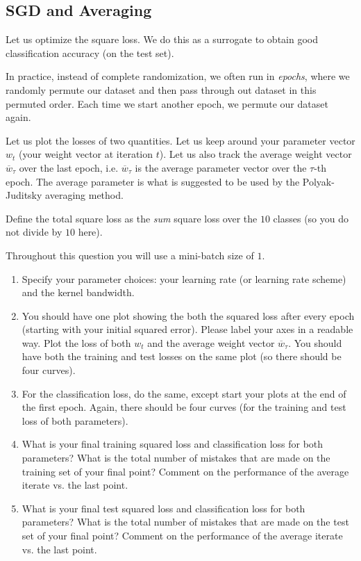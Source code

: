 \documentclass{article}
\begin{document}
\subsection{SGD and Averaging}
Let us optimize the square loss. We do this as a surrogate to obtain good classification accuracy (on the test set).

In practice, instead of complete randomization, we often run in \emph{epochs}, where we randomly permute our dataset and then pass through out dataset in this permuted order. Each time we start another epoch, we permute our dataset again.

Let us plot the losses of two quantities. Let us keep around your parameter vector $w_t$ (your weight vector at iteration $t$). Let us also track the average weight vector $\overline{w}_\tau$ over the last epoch, i.e. $\overline{w}_\tau$ is the average parameter vector over the $\tau$-th epoch.  The average parameter is what is suggested to be used by the Polyak-Juditsky averaging method.

Define the total square loss as the \emph{sum} square loss over the $10$ classes (so you do not divide by $10$ here).

Throughout this question you will use a mini-batch size of $1$.

\begin{enumerate}
	\item Specify your parameter choices: your learning rate (or learning rate scheme) and the kernel bandwidth.
	\item You should have one plot showing the both the squared loss after every epoch (starting with your initial squared error). Please label your axes in a readable way.  Plot the loss of both $w_t$ and the average weight vector $\overline{w}_\tau$. You should have both the training and test losses on the same plot (so there should be four curves).
	\item For the classification loss, do the same, except start your plots at the end of the first epoch. Again, there should be four curves (for the training and test loss of both parameters).
	\item  What is your final training squared loss and classification loss for both parameters? What is the total number of mistakes that are made on the training set of your final point? Comment on the performance of the average iterate vs. the last point.
	\item What is your final test squared loss and classification loss for both parameters? What is the total number of mistakes that are made on the test set of your final point? Comment on the performance of the average iterate vs. the last point.
\end{enumerate}
\end{document}
